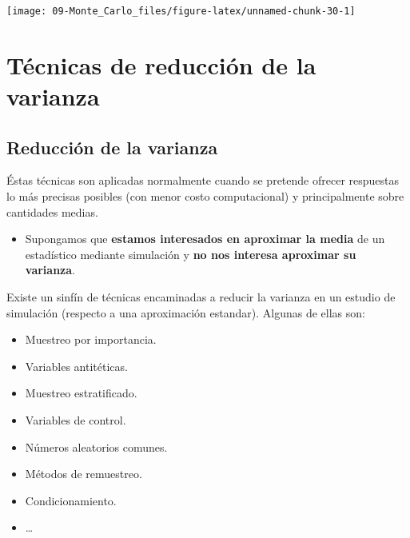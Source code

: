 \documentclass[
]{book}
\newenvironment{Shaded}{\begin{snugshade}}{\end{snugshade}}
\newcommand{\CommentTok}[1]{\textcolor[rgb]{0.56,0.35,0.01}{\textit{#1}}}
\newcommand{\DataTypeTok}[1]{\textcolor[rgb]{0.13,0.29,0.53}{#1}}
\newcommand{\DecValTok}[1]{\textcolor[rgb]{0.00,0.00,0.81}{#1}}
\newcommand{\KeywordTok}[1]{\textcolor[rgb]{0.13,0.29,0.53}{\textbf{#1}}}
\newcommand{\NormalTok}[1]{#1}
\newcommand{\OperatorTok}[1]{\textcolor[rgb]{0.81,0.36,0.00}{\textbf{#1}}}
\providecommand{\tightlist}{%
  \setlength{\itemsep}{0pt}\setlength{\parskip}{0pt}}
\theoremstyle{break}
\theoremstyle{definition}
\theoremstyle{definition}
\theoremstyle{definition}
\theoremstyle{remark}
\begin{document}
\begin{Shaded}
\end{Shaded}

\begin{center}\texttt{[image: 09-Monte\_Carlo\_files/figure-latex/unnamed-chunk-30-1]} \end{center}

\hypertarget{tuxe9cnicas-de-reducciuxf3n-de-la-varianza}{%
\chapter{Técnicas de reducción de la varianza}\label{tuxe9cnicas-de-reducciuxf3n-de-la-varianza}}

\hypertarget{reducciuxf3n-de-la-varianza}{%
\section{Reducción de la varianza}\label{reducciuxf3n-de-la-varianza}}

Éstas técnicas son aplicadas normalmente cuando se pretende ofrecer respuestas
lo más precisas posibles (con menor costo computacional) y principalmente sobre cantidades medias.

\begin{itemize}
\tightlist
\item
  Supongamos que \textbf{estamos interesados en aproximar la media} de un
  estadístico mediante simulación y
  \textbf{no nos interesa aproximar su varianza}.
\end{itemize}

Existe un sinfín de técnicas encaminadas a reducir la varianza en un
estudio de simulación (respecto a una aproximación estandar).
Algunas de ellas son:

\begin{itemize}
\item
  Muestreo por importancia.
\item
  Variables antitéticas.
\item
  Muestreo estratificado.
\item
  Variables de control.
\item
  Números aleatorios comunes.
\item
  Métodos de remuestreo.
\item
  Condicionamiento.
\item
  \ldots{}
\end{itemize}
\end{document}
